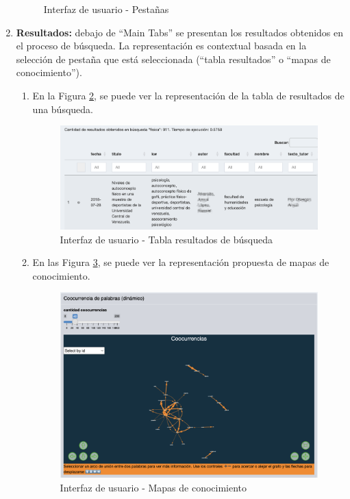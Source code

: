 \documentclass[
  12pt,
  openany]{book}
\begin{document}
\begin{enumerate}
\begin{figure}
{  }

  \caption{Interfaz de usuario - Pestañas }\label{fig:maintab}
  \end{figure}
\item
  \textbf{Resultados:} debajo de ``Main Tabs'' se presentan los resultados obtenidos en el proceso de búsqueda. La representación es contextual basada en la selección de pestaña que está seleccionada (``tabla resultados'' o ``mapas de conocimiento'').

  \begin{enumerate}
  \def\labelenumii{\arabic{enumii}.}
  \item
    En la Figura \ref{fig:tablaresultados2}, se puede ver la representación de la tabla de resultados de una búsqueda.

    \begin{figure}

    {\centering \includegraphics[width=0.9\linewidth]{images/05-desarrollo/4_ciclo/UI/tablaresultado} 

    }

    \caption{Interfaz de usuario - Tabla resultados de búsqueda}\label{fig:tablaresultados2}
    \end{figure}
  \item
    En las Figura \ref{fig:tablaresultados3}, se puede ver la representación propuesta de mapas de conocimiento.

    \begin{figure}

    {\centering \includegraphics[width=0.7\linewidth]{images/05-desarrollo/4_ciclo/UI/uimapas} 

    }

    \caption{Interfaz de usuario - Mapas de conocimiento}\label{fig:tablaresultados3}
    \end{figure}
  \end{enumerate}
\end{enumerate}
\end{document}
